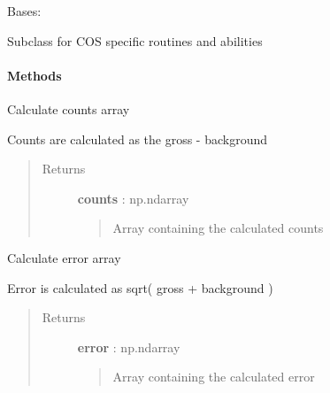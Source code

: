 \documentclass[letterpaper,10pt,english]{sphinxmanual}
\begin{document}
\begin{fulllineitems}
\label{index:lightcurve.cos.CosCurve}
Bases: {\hyperref[index:lightcurve.lightcurve.LightCurve]{}}

Subclass for COS specific routines and abilities
\paragraph{Methods}

\begin{fulllineitems}
\label{index:lightcurve.cos.CosCurve.counts}
Calculate counts array

Counts are calculated as the gross - background
\begin{quote}\begin{description}
\item[{Returns }] \leavevmode
\textbf{counts} : np.ndarray
\begin{quote}

Array containing the calculated counts
\end{quote}

\end{description}\end{quote}

\end{fulllineitems}


\begin{fulllineitems}
\label{index:lightcurve.cos.CosCurve.error}
Calculate error array

Error is calculated as sqrt( gross + background )
\begin{quote}\begin{description}
\item[{Returns }] \leavevmode
\textbf{error} : np.ndarray
\begin{quote}

Array containing the calculated error
\end{quote}

\end{description}\end{quote}

\end{fulllineitems}


\end{fulllineitems}
\end{document}
